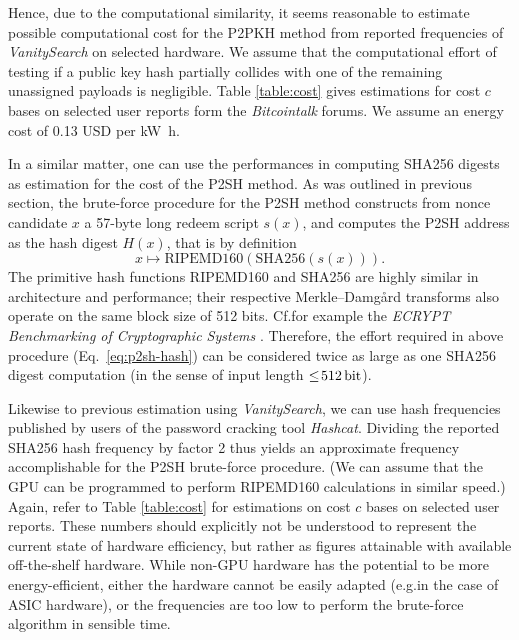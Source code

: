 \documentclass[a4paper,11pt,titlepage]{scrbook}
\begin{document}
Hence, due to the computational similarity, it seems reasonable to estimate possible computational cost for the {P2PKH} method from reported frequencies of \emph{VanitySearch} on selected hardware.
We assume that the computational effort of testing if a public key hash partially collides with one of the remaining unassigned payloads is negligible.
Table \ref{table:cost} gives estimations for cost $c$ bases on selected user reports form the \emph{Bitcointalk} forums.
We assume an energy cost of \num{.13} USD per \si{\kilo\watt\hour}. 

In a similar matter, one can use the performances in computing {SHA256} digests as estimation for the cost of the {P2SH} method.
As was outlined in previous section, the brute-force procedure for the {P2SH} method constructs from nonce candidate $x$ a 57-byte long redeem script $s(x)$, and computes the {P2SH} address as the hash digest $H(x)$, that is by definition
\begin{equation}
    x \mapsto \text{{RIPEMD160}}(\text{{SHA256}}(s(x))).\label{eq:p2sh-hash}
\end{equation}
The primitive hash functions {RIPEMD160} and {SHA256} are highly similar in architecture and performance; their respective Merkle–Damgård transforms also operate on the same block size of 512 bits. 
Cf.\@ for example the \emph{ECRYPT Benchmarking of Cryptographic Systems} \cite{bernstein_benchmark}.
Therefore, the effort required in above procedure (Eq.~\ref{eq:p2sh-hash}) can be considered twice as large as one {SHA256} digest computation (in the sense of input length $\leq\!\SI{512}{\bit}$). 

Likewise to previous estimation using \emph{VanitySearch}, we can use hash frequencies published by users of the password cracking tool \emph{Hashcat}.
Dividing the reported SHA256 hash frequency by factor 2 thus yields an approximate frequency accomplishable for the P2SH brute-force procedure.
(We can assume that the GPU can be programmed to perform RIPEMD160 calculations in similar speed.)
Again, refer to Table \ref{table:cost} for estimations on cost $c$ bases on selected user reports.
These numbers should explicitly not be understood to represent the current state of hardware efficiency, but rather as figures attainable with available off-the-shelf hardware.
While non-GPU hardware has the potential to be more energy-efficient, either the hardware cannot be easily adapted (e.g.\@ in the case of ASIC hardware), or the frequencies are too low to perform the brute-force algorithm in sensible time.
\end{document}

